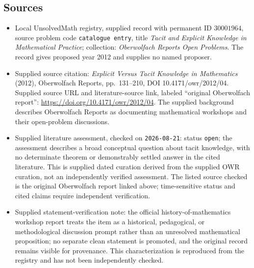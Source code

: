 \documentclass[11pt]{article}
\begin{document}
\subsection{Sources}
\begin{itemize}
\item Local UnsolvedMath registry, supplied record with permanent ID \(30001964\), source problem code \texttt{catalogue entry}, title \emph{Tacit and Explicit Knowledge in Mathematical Practice}; collection: \emph{Oberwolfach Reports Open Problems}. The record gives proposed year 2012 and supplies no named proposer.
\item Supplied source citation: \emph{Explicit Versus Tacit Knowledge in Mathematics} (2012), Oberwolfach Reports, pp.~131--210, DOI 10.4171/owr/2012/04. Supplied source URL and literature-source link, labeled ``original Oberwolfach report'': \url{https://doi.org/10.4171/owr/2012/04}. The supplied background describes Oberwolfach Reports as documenting mathematical workshops and their open-problem discussions.
\item Supplied literature assessment, checked on \texttt{2026-08-21}: status \texttt{open}; the assessment describes a broad conceptual question about tacit knowledge, with no determinate theorem or demonstrably settled answer in the cited literature. This is supplied dated curation derived from the supplied OWR curation, not an independently verified assessment. The listed source checked is the original Oberwolfach report linked above; time-sensitive status and cited claims require independent verification.
\item Supplied statement-verification note: the official history-of-mathematics workshop report treats the item as a historical, pedagogical, or methodological discussion prompt rather than an unresolved mathematical proposition; no separate clean statement is promoted, and the original record remains visible for provenance. This characterization is reproduced from the registry and has not been independently checked.
\end{itemize}
\end{document}
